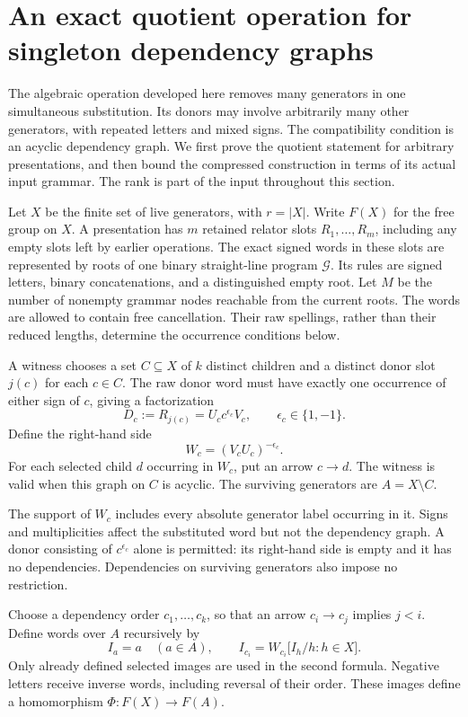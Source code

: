 \section{An exact quotient operation for singleton dependency graphs}
\label{alg:setting}

The algebraic operation developed here removes many generators in one
simultaneous substitution. Its donors may involve arbitrarily many other
generators, with repeated letters and mixed signs. The compatibility
condition is an acyclic dependency graph. We first prove the quotient
statement for arbitrary presentations, and then bound the compressed
construction in terms of its actual input grammar. The rank is part of
the input throughout this section.

Let $X$ be the finite set of live generators, with $r=|X|$. Write $F(X)$
for the free group on $X$. A presentation has $m$ retained relator slots
$R_1,\ldots,R_m$, including any empty slots left by earlier operations.
The exact signed words in these slots are represented by roots of one
binary straight-line program $\mathcal G$. Its rules are signed letters,
binary concatenations, and a distinguished empty root. Let $M$ be the
number of nonempty grammar nodes reachable from the current roots.
The words are allowed to contain free cancellation. Their raw spellings,
rather than their reduced lengths, determine the occurrence conditions below.

\begin{definition}
\label{alg:def-witness}
A witness chooses a set $C\subseteq X$ of $k$ distinct children and a
distinct donor slot $j(c)$ for each $c\in C$. The raw donor word must have
exactly one occurrence of either sign of $c$, giving a factorization
\[
 D_c:=R_{j(c)}=U_c c^{\epsilon_c}V_c,
 \qquad \epsilon_c\in\{1,-1\}.
\]
Define the right-hand side
\[
 W_c=(V_cU_c)^{-\epsilon_c}.
\]
For each selected child $d$ occurring in $W_c$, put an arrow $c\to d$.
The witness is valid when this graph on $C$ is acyclic. The surviving
generators are $A=X\setminus C$.
\end{definition}

The support of $W_c$ includes every absolute generator label occurring
in it. Signs and multiplicities affect the substituted word but not the
dependency graph. A donor consisting of $c^{\epsilon_c}$ alone is
permitted: its right-hand side is empty and it has no dependencies.
Dependencies on surviving generators also impose no restriction.

Choose a dependency order $c_1,\ldots,c_k$, so that an arrow
$c_i\to c_j$ implies $j<i$. Define words over $A$ recursively by
\[
 I_a=a\quad(a\in A),\qquad
 I_{c_i}=W_{c_i}\bigl[I_h/h:h\in X\bigr].
\]
Only already defined selected images are used in the second formula.
Negative letters receive inverse words, including reversal of their order.
These images define a homomorphism $\Phi:F(X)\to F(A)$.


